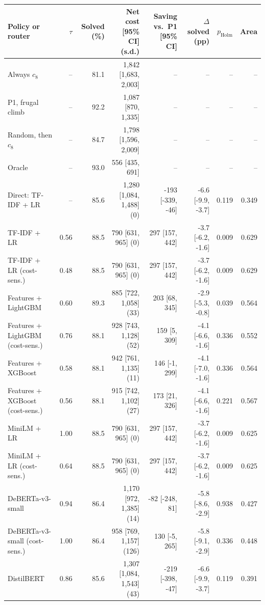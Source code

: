 \setlength{\tabcolsep}{4pt}
\begin{tabular}{@{}lrrrrrrr@{}}
\toprule
Policy or router & $\tau$ & Solved (\%) & Net cost [95\% CI] (s.d.) & Saving vs.\ P1 [95\% CI] & $\Delta$ solved (pp) & $p_{\mathrm{Holm}}$ & Area \\
\midrule
Always $c_8$ & -- & 81.1 & 1{,}842 [1{,}683, 2{,}003] & -- & -- & -- & -- \\
P1, frugal climb & -- & 92.2 & 1{,}087 [870, 1{,}335] & -- & -- & -- & -- \\
Random, then $c_8$ & -- & 84.7 & 1{,}798 [1{,}596, 2{,}009] & -- & -- & -- & -- \\
Oracle & -- & 93.0 & 556 [435, 691] & -- & -- & -- & -- \\
\midrule
Direct: TF-IDF + LR & -- & 85.6 & 1{,}280 [1{,}084, 1{,}488] (0) & -193 [-339, -46] & -6.6 [-9.9, -3.7] & 0.119 & 0.349 \\
TF-IDF + LR & 0.56 & 88.5 & 790 [631, 965] (0) & 297 [157, 442] & -3.7 [-6.2, -1.6] & 0.009 & 0.629 \\
TF-IDF + LR (cost-sens.) & 0.48 & 88.5 & 790 [631, 965] (0) & 297 [157, 442] & -3.7 [-6.2, -1.6] & 0.009 & 0.629 \\
Features + LightGBM & 0.60 & 89.3 & 885 [722, 1{,}058] (33) & 203 [68, 345] & -2.9 [-5.3, -0.8] & 0.039 & 0.564 \\
Features + LightGBM (cost-sens.) & 0.76 & 88.1 & 928 [743, 1{,}128] (52) & 159 [5, 309] & -4.1 [-6.6, -1.6] & 0.336 & 0.552 \\
Features + XGBoost & 0.58 & 88.1 & 942 [761, 1{,}135] (11) & 146 [-1, 299] & -4.1 [-7.0, -1.6] & 0.336 & 0.564 \\
Features + XGBoost (cost-sens.) & 0.56 & 88.1 & 915 [742, 1{,}102] (27) & 173 [21, 326] & -4.1 [-6.6, -1.6] & 0.221 & 0.567 \\
MiniLM + LR & 1.00 & 88.5 & 790 [631, 965] (0) & 297 [157, 442] & -3.7 [-6.2, -1.6] & 0.009 & 0.625 \\
MiniLM + LR (cost-sens.) & 0.64 & 88.5 & 790 [631, 965] (0) & 297 [157, 442] & -3.7 [-6.2, -1.6] & 0.009 & 0.625 \\
DeBERTa-v3-small & 0.94 & 86.4 & 1{,}170 [972, 1{,}385] (14) & -82 [-248, 81] & -5.8 [-8.6, -2.9] & 0.938 & 0.427 \\
DeBERTa-v3-small (cost-sens.) & 1.00 & 86.4 & 958 [769, 1{,}157] (126) & 130 [-5, 265] & -5.8 [-9.1, -2.9] & 0.336 & 0.448 \\
DistilBERT & 0.86 & 85.6 & 1{,}307 [1{,}084, 1{,}543] (43) & -219 [-398, -47] & -6.6 [-9.9, -3.7] & 0.119 & 0.391 \\

\end{tabular}
